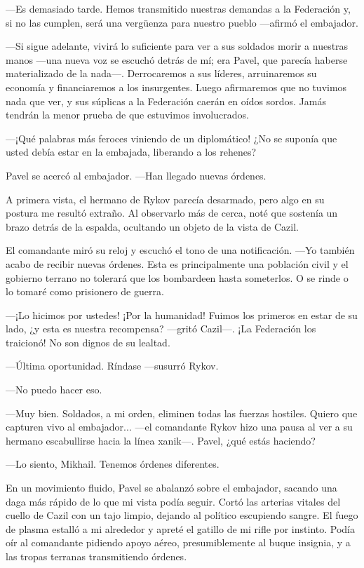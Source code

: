 —Es demasiado tarde. Hemos transmitido nuestras demandas a la Federación y, si no las cumplen, será una vergüenza para nuestro pueblo —afirmó el embajador.

—Si sigue adelante, vivirá lo suficiente para ver a sus soldados morir a nuestras manos —una nueva voz se escuchó detrás de mí; era Pavel, que parecía haberse materializado de la nada—. Derrocaremos a sus líderes, arruinaremos su economía y financiaremos a los insurgentes. Luego afirmaremos que no tuvimos nada que ver, y sus súplicas a la Federación caerán en oídos sordos. Jamás tendrán la menor prueba de que estuvimos involucrados.

—¡Qué palabras más feroces viniendo de un diplomático! ¿No se suponía que usted debía estar en la embajada, liberando a los rehenes?

Pavel se acercó al embajador. —Han llegado nuevas órdenes.

A primera vista, el hermano de Rykov parecía desarmado, pero algo en su postura me resultó extraño. Al observarlo más de cerca, noté que sostenía un brazo detrás de la espalda, ocultando un objeto de la vista de Cazil.

El comandante miró su reloj y escuchó el tono de una notificación. —Yo también acabo de recibir nuevas órdenes. Esta es principalmente una población civil y el gobierno terrano no tolerará que los bombardeen hasta someterlos. O se rinde o lo tomaré como prisionero de guerra.

—¡Lo hicimos por ustedes! ¡Por la humanidad! Fuimos los primeros en estar de su lado, ¿y esta es nuestra recompensa? —gritó Cazil—. ¡La Federación los traicionó! No son dignos de su lealtad.

—Última oportunidad. Ríndase —susurró Rykov.

—No puedo hacer eso.

—Muy bien. Soldados, a mi orden, eliminen todas las fuerzas hostiles. Quiero que capturen vivo al embajador... —el comandante Rykov hizo una pausa al ver a su hermano escabullirse hacia la línea xanik—. Pavel, ¿qué estás haciendo?

—Lo siento, Mikhail. Tenemos órdenes diferentes.

En un movimiento fluido, Pavel se abalanzó sobre el embajador, sacando una daga más rápido de lo que mi vista podía seguir. Cortó las arterias vitales del cuello de Cazil con un tajo limpio, dejando al político escupiendo sangre. El fuego de plasma estalló a mi alrededor y apreté el gatillo de mi rifle por instinto. Podía oír al comandante pidiendo apoyo aéreo, presumiblemente al buque insignia, y a las tropas terranas transmitiendo órdenes.

